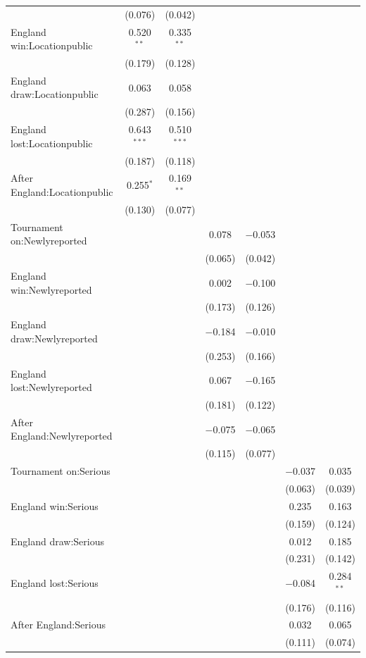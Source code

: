 \documentclass[12pt, letterpaper]{article}
\begin{document}
\begin{table}
{\begin{tabular}{@{\extracolsep{5pt}}lcccccc}
  & (0.076) & (0.042) &  &  &  &  \\ 
  England win:Locationpublic & 0.520$^{**}$ & 0.335$^{**}$ &  &  &  &  \\ 
  & (0.179) & (0.128) &  &  &  &  \\ 
  England draw:Locationpublic & 0.063 & 0.058 &  &  &  &  \\ 
  & (0.287) & (0.156) &  &  &  &  \\ 
  England lost:Locationpublic & 0.643$^{***}$ & 0.510$^{***}$ &  &  &  &  \\ 
  & (0.187) & (0.118) &  &  &  &  \\ 
  After England:Locationpublic & 0.255$^{*}$ & 0.169$^{**}$ &  &  &  &  \\ 
  & (0.130) & (0.077) &  &  &  &  \\ 
  Tournament on:Newlyreported &  &  & 0.078 & $-$0.053 &  &  \\ 
  &  &  & (0.065) & (0.042) &  &  \\ 
  England win:Newlyreported &  &  & 0.002 & $-$0.100 &  &  \\ 
  &  &  & (0.173) & (0.126) &  &  \\ 
  England draw:Newlyreported &  &  & $-$0.184 & $-$0.010 &  &  \\ 
  &  &  & (0.253) & (0.166) &  &  \\ 
  England lost:Newlyreported &  &  & 0.067 & $-$0.165 &  &  \\ 
  &  &  & (0.181) & (0.122) &  &  \\ 
  After England:Newlyreported &  &  & $-$0.075 & $-$0.065 &  &  \\ 
  &  &  & (0.115) & (0.077) &  &  \\ 
  Tournament on:Serious &  &  &  &  & $-$0.037 & 0.035 \\ 
  &  &  &  &  & (0.063) & (0.039) \\ 
  England win:Serious &  &  &  &  & 0.235 & 0.163 \\ 
  &  &  &  &  & (0.159) & (0.124) \\ 
  England draw:Serious &  &  &  &  & 0.012 & 0.185 \\ 
  &  &  &  &  & (0.231) & (0.142) \\ 
  England lost:Serious &  &  &  &  & $-$0.084 & 0.284$^{**}$ \\ 
  &  &  &  &  & (0.176) & (0.116) \\ 
  After England:Serious &  &  &  &  & 0.032 & 0.065 \\ 
  &  &  &  &  & (0.111) & (0.074) \\ 

\end{tabular}}
\end{table}
\end{document}

